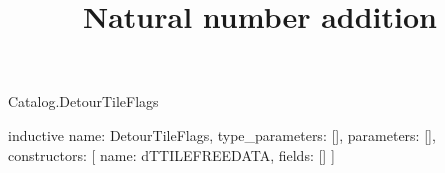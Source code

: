 \begin{lexlean}{Catalog.DetourTileFlags}
\title{Natural number addition}
\begin{semanticmodule}
inductive{
  name: DetourTileFlags,
  type_parameters: [],
  parameters: [],
  constructors: [
    {name: dTTILEFREEDATA, fields: []}
  ]
}
\end{semanticmodule}
\end{lexlean}
